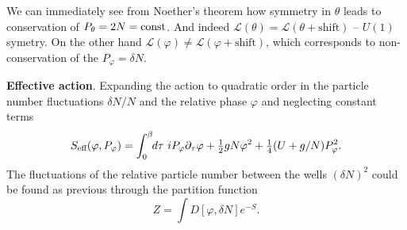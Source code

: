 We can immediately see from Noether’s theorem how symmetry in $\theta$ leads to conservation of $P_\theta = 2N = \textnormal{const}$. And indeed $\mathcal{L}(\theta) = \mathcal{L}(\theta + \text{shift})$ -- $U(1)$ symetry. On the other hand $\mathcal{L}(\varphi) \neq \mathcal{L}(\varphi+\text{shift})$, which corresponds to non-conservation of the $P_\varphi = \delta N$.

\textbf{Effective action}. Expanding the action to quadratic order in the particle number fluctuations $\delta N / N$ and the relative phase $\varphi$ and neglecting constant terms
\begin{equation*}
	S_{\textnormal{eff}}(\varphi, P_\varphi) = \int_{0}^{\beta} \hspace{-1mm} d \tau\  i P_\varphi \partial_\tau \varphi + \tfrac{1}{2} g N\varphi^2 + \tfrac{1}{4}(U + g / N)P_\varphi^2.
\end{equation*}
The fluctuations of the relative particle number
between the wells $(\delta N)^2$ could be found as previous through the partition function
\begin{equation*}
	Z = \int D[\varphi, \delta N] e^{-S}.
\end{equation*}